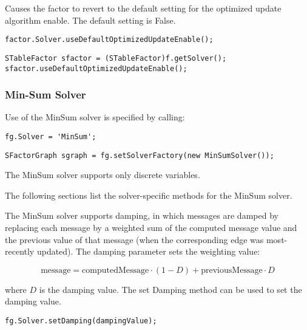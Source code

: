 
Causes the factor to revert to the default setting for the optimized update algorithm enable. The default setting is False.

\ifmatlab
\begin{lstlisting}
factor.Solver.useDefaultOptimizedUpdateEnable();
\end{lstlisting}
\fi

\ifjava
\begin{lstlisting}
STableFactor sfactor = (STableFactor)f.getSolver();
sfactor.useDefaultOptimizedUpdateEnable();
\end{lstlisting}
\fi

\subsubsection{Min-Sum Solver}

Use of the MinSum solver is specified by calling:

\ifmatlab
\begin{lstlisting}
fg.Solver = 'MinSum';
\end{lstlisting}
\fi

\ifjava
\begin{lstlisting}
SFactorGraph sgraph = fg.setSolverFactory(new MinSumSolver());
\end{lstlisting}
\fi

The MinSum solver supports only discrete variables.

The following sections list the solver-specific methods for the MinSum solver.



The MinSum solver supports damping, in which messages are damped by replacing each message by a weighted sum of the computed message value and the previous value of that message (when the corresponding edge was most-recently updated).  The damping parameter sets the weighting value:

\[
\mathrm{message} = \mathrm{computedMessage} \cdot (1 - D) + \mathrm{previousMessage} \cdot D
\]

where $D$ is the damping value.  The set Damping method can be used to set the damping value.

\ifmatlab
\begin{lstlisting}
fg.Solver.setDamping(dampingValue);
\end{lstlisting}
\fi

